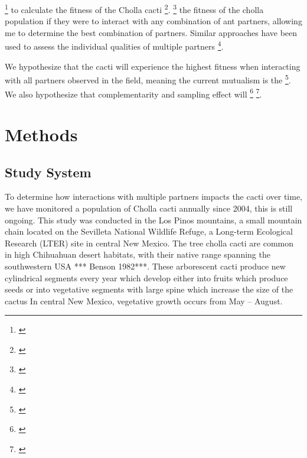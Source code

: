 \documentclass[12pt,a4paper]{article}
\newcommand{\tom}[2]{{\color{red}{#1}}\footnote{\textit{\color{red}{#2}}}}
\begin{document}
\tom{In order to answer these questions, I am constructing an Integral Projection Model (IPM)}{This is only one piece of what you are doing. I think the value of the long-term data should be better emphasized.} to calculate the fitness of the Cholla cacti \tom{under different conditions}{What conditions?}. 
\tom{I will be able to quantitatively estimate}{Use plural pronouns and don't use future tense, this is not a proposal.} the fitness of the cholla population if they were to interact with any combination of ant partners, allowing me to determine the best combination of partners. 
Similar approaches have been used to assess the individual qualities of multiple partners\cite{Palmer2010} \tom{but not to determine the optimal combination of partners in a multi-species mutualism}{The Palmer paper and perhaps others have done this. I think the novel contribution of this paper needs to be better explained.}. 

We hypothesize that the cacti will experience the highest fitness when interacting with all partners observed in the field, meaning the current mutualism is the \tom{optimal outcome}{I would avoid mention of optimality, which has an evolutionary implication that we are not addressing here}. 
We also hypothesize that complementarity and sampling effect will \tom{play roles in encouraging this}{vague - sharpen this} \tom{diverse mutualism}{A mutualism cannot be `diverse'.}. 	

\section*{Methods}
\subsection*{Study System}

To determine how interactions with multiple partners impacts the cacti over time, we have monitored a population of Cholla cacti annually since 2004, this is still ongoing. This study was conducted in the Los Pinos mountains, a small mountain chain located on the Sevilleta National Wildlife Refuge, a Long-term Ecological Research (LTER) site in central New Mexico. The tree cholla cacti are common in high Chihuahuan desert habitats, with their native range spanning the southwestern USA *** Benson 1982***. These arborescent cacti produce new cylindrical segments every year which develop either into fruits which produce seeds or into vegetative segments with large spine which increase the size of the cactus %
In central New Mexico, vegetative growth occurs from May -- August.
\end{document}
